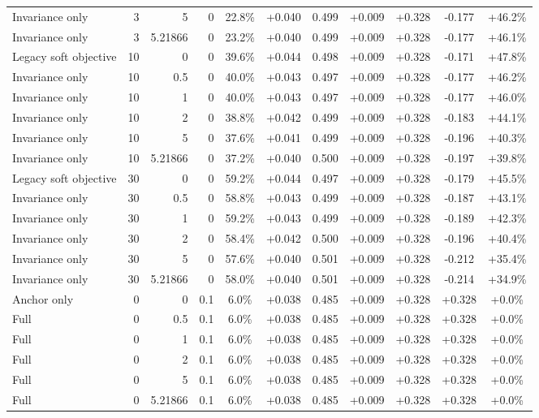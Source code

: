 \begin{table}[htbp]
\begin{tabular}{lrrrccccccc}
Invariance only & 3 & 5 & 0 & 22.8\% & +0.040 & 0.499 & +0.009 & +0.328 & -0.177 & +46.2\% \\
Invariance only & 3 & 5.21866 & 0 & 23.2\% & +0.040 & 0.499 & +0.009 & +0.328 & -0.177 & +46.1\% \\
Legacy soft objective & 10 & 0 & 0 & 39.6\% & +0.044 & 0.498 & +0.009 & +0.328 & -0.171 & +47.8\% \\
Invariance only & 10 & 0.5 & 0 & 40.0\% & +0.043 & 0.497 & +0.009 & +0.328 & -0.177 & +46.2\% \\
Invariance only & 10 & 1 & 0 & 40.0\% & +0.043 & 0.497 & +0.009 & +0.328 & -0.177 & +46.0\% \\
Invariance only & 10 & 2 & 0 & 38.8\% & +0.042 & 0.499 & +0.009 & +0.328 & -0.183 & +44.1\% \\
Invariance only & 10 & 5 & 0 & 37.6\% & +0.041 & 0.499 & +0.009 & +0.328 & -0.196 & +40.3\% \\
Invariance only & 10 & 5.21866 & 0 & 37.2\% & +0.040 & 0.500 & +0.009 & +0.328 & -0.197 & +39.8\% \\
Legacy soft objective & 30 & 0 & 0 & 59.2\% & +0.044 & 0.497 & +0.009 & +0.328 & -0.179 & +45.5\% \\
Invariance only & 30 & 0.5 & 0 & 58.8\% & +0.043 & 0.499 & +0.009 & +0.328 & -0.187 & +43.1\% \\
Invariance only & 30 & 1 & 0 & 59.2\% & +0.043 & 0.499 & +0.009 & +0.328 & -0.189 & +42.3\% \\
Invariance only & 30 & 2 & 0 & 58.4\% & +0.042 & 0.500 & +0.009 & +0.328 & -0.196 & +40.4\% \\
Invariance only & 30 & 5 & 0 & 57.6\% & +0.040 & 0.501 & +0.009 & +0.328 & -0.212 & +35.4\% \\
Invariance only & 30 & 5.21866 & 0 & 58.0\% & +0.040 & 0.501 & +0.009 & +0.328 & -0.214 & +34.9\% \\
Anchor only & 0 & 0 & 0.1 & 6.0\% & +0.038 & 0.485 & +0.009 & +0.328 & +0.328 & +0.0\% \\
Full & 0 & 0.5 & 0.1 & 6.0\% & +0.038 & 0.485 & +0.009 & +0.328 & +0.328 & +0.0\% \\
Full & 0 & 1 & 0.1 & 6.0\% & +0.038 & 0.485 & +0.009 & +0.328 & +0.328 & +0.0\% \\
Full & 0 & 2 & 0.1 & 6.0\% & +0.038 & 0.485 & +0.009 & +0.328 & +0.328 & +0.0\% \\
Full & 0 & 5 & 0.1 & 6.0\% & +0.038 & 0.485 & +0.009 & +0.328 & +0.328 & +0.0\% \\
Full & 0 & 5.21866 & 0.1 & 6.0\% & +0.038 & 0.485 & +0.009 & +0.328 & +0.328 & +0.0\% \\

\end{tabular}
\end{table}
